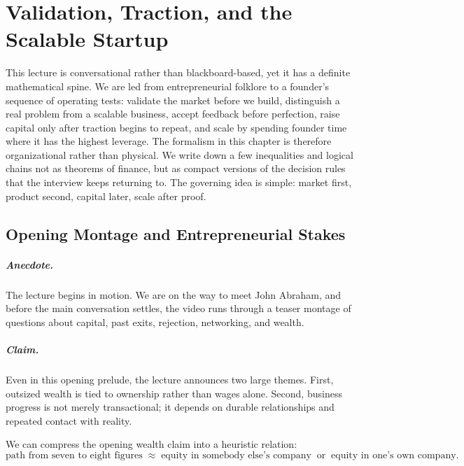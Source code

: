 \chapter{Validation, Traction, and the Scalable Startup}

This lecture is conversational rather than blackboard-based, yet it has a definite mathematical spine. We are led from entrepreneurial folklore to a founder's sequence of operating tests: validate the market before we build, distinguish a real problem from a scalable business, accept feedback before perfection, raise capital only after traction begins to repeat, and scale by spending founder time where it has the highest leverage. The formalism in this chapter is therefore organizational rather than physical. We write down a few inequalities and logical chains not as theorems of finance, but as compact versions of the decision rules that the interview keeps returning to. The governing idea is simple: market first, product second, capital later, scale after proof.

\section{Opening Montage and Entrepreneurial Stakes}

\paragraph{Anecdote.} The lecture begins in motion. We are on the way to meet John Abraham, and before the main conversation settles, the video runs through a teaser montage of questions about capital, past exits, rejection, networking, and wealth.

\paragraph{Claim.} Even in this opening prelude, the lecture announces two large themes. First, outsized wealth is tied to ownership rather than wages alone. Second, business progress is not merely transactional; it depends on durable relationships and repeated contact with reality.

We can compress the opening wealth claim into a heuristic relation:
\begin{equation}
\text{path from seven to eight figures}
\;\approx\;
\text{equity in somebody else's company}
\;\;\text{or}\;\;
\text{equity in one's own company}.
\end{equation}

